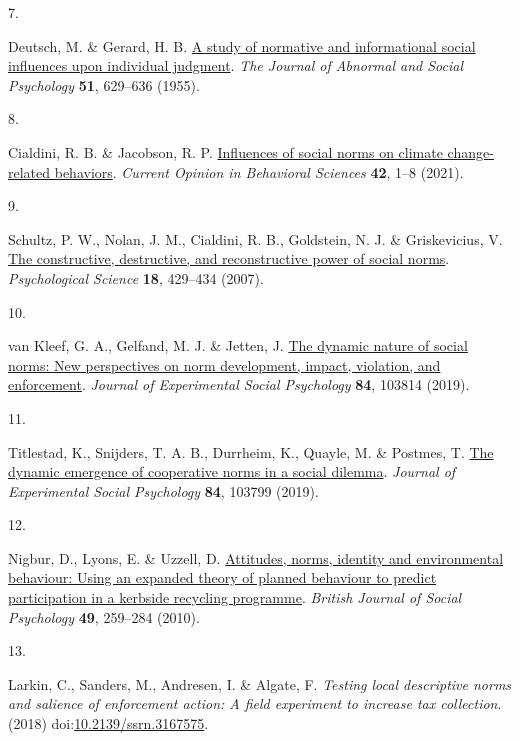 \documentclass[
  man, donotrepeattitle,floatsintext]{apa6}
\newlength{\cslhangindent}
\newlength{\csllabelwidth}
\newlength{\cslentryspacingunit} %
\newenvironment{CSLReferences}[2] %
 {%
  \setlength{\parindent}{0pt}
  \ifodd #1
  \let\oldpar\par
  \def\par{\hangindent=\cslhangindent\oldpar}
  \fi
  \setlength{\parskip}{#2\cslentryspacingunit}
 }%
 {}
\newcommand{\CSLLeftMargin}[1]{\parbox[t]{\csllabelwidth}{#1}}
\newcommand{\CSLRightInline}[1]{\parbox[t]{\linewidth - \csllabelwidth}{#1}\break}
\begin{document}
\begin{CSLReferences}{0}{0}
\leavevmode{}%
\CSLLeftMargin{7. }%
\CSLRightInline{Deutsch, M. \& Gerard, H. B. \href{https://doi.org/10.1037/h0046408}{A study of normative and informational social influences upon individual judgment}. \emph{The Journal of Abnormal and Social Psychology} \textbf{51}, 629--636 (1955).}

\leavevmode{}%
\CSLLeftMargin{8. }%
\CSLRightInline{Cialdini, R. B. \& Jacobson, R. P. \href{https://doi.org/10.1016/j.cobeha.2021.01.005}{Influences of social norms on climate change-related behaviors}. \emph{Current Opinion in Behavioral Sciences} \textbf{42}, 1--8 (2021).}

\leavevmode{}%
\CSLLeftMargin{9. }%
\CSLRightInline{Schultz, P. W., Nolan, J. M., Cialdini, R. B., Goldstein, N. J. \& Griskevicius, V. \href{https://doi.org/10.1111/j.1467-9280.2007.01917.x}{The constructive, destructive, and reconstructive power of social norms}. \emph{Psychological Science} \textbf{18}, 429--434 (2007).}

\leavevmode{}%
\CSLLeftMargin{10. }%
\CSLRightInline{van Kleef, G. A., Gelfand, M. J. \& Jetten, J. \href{https://doi.org/10.1016/j.jesp.2019.05.002}{The dynamic nature of social norms: New perspectives on norm development, impact, violation, and enforcement}. \emph{Journal of Experimental Social Psychology} \textbf{84}, 103814 (2019).}

\leavevmode{}%
\CSLLeftMargin{11. }%
\CSLRightInline{Titlestad, K., Snijders, T. A. B., Durrheim, K., Quayle, M. \& Postmes, T. \href{https://doi.org/10.1016/j.jesp.2019.03.010}{The dynamic emergence of cooperative norms in a social dilemma}. \emph{Journal of Experimental Social Psychology} \textbf{84}, 103799 (2019).}

\leavevmode{}%
\CSLLeftMargin{12. }%
\CSLRightInline{Nigbur, D., Lyons, E. \& Uzzell, D. \href{https://doi.org/10.1348/014466609X449395}{Attitudes, norms, identity and environmental behaviour: Using an expanded theory of planned behaviour to predict participation in a kerbside recycling programme}. \emph{British Journal of Social Psychology} \textbf{49}, 259--284 (2010).}

\leavevmode{}%
\CSLLeftMargin{13. }%
\CSLRightInline{Larkin, C., Sanders, M., Andresen, I. \& Algate, F. \emph{Testing local descriptive norms and salience of enforcement action: A field experiment to increase tax collection}. (2018) doi:\href{https://doi.org/10.2139/ssrn.3167575}{10.2139/ssrn.3167575}.}


\end{CSLReferences}
\end{document}
